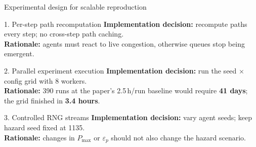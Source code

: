 \documentclass[aspectratio=169, xcolor=table]{beamer}
\begin{document}
\begin{frame}[t]{Experimental design for scalable reproduction}
\footnotesize

\begin{block}{\scriptsize 1. Per-step path recomputation}
\scriptsize
\textbf{Implementation decision:} recompute paths every step; no cross-step path caching.\\
\textbf{Rationale:} agents must react to live congestion, otherwise queues stop being emergent.
\end{block}

\vspace{0.3em}

\begin{block}{\scriptsize 2. Parallel experiment execution}
\scriptsize
\textbf{Implementation decision:} run the seed $\times$ config grid with 8 workers.\\
\textbf{Rationale:} 390 runs at the paper's 2.5\,h/run baseline would require \textbf{41 days}; the grid finished in \textbf{3.4 hours}.
\end{block}

\vspace{0.3em}

\begin{block}{\scriptsize 3. Controlled RNG streams}
\scriptsize
\textbf{Implementation decision:} vary agent seeds; keep hazard seed fixed at 1135.\\
\textbf{Rationale:} changes in $P_{\max}$ or $\varepsilon_p$ should not also change the hazard scenario.
\end{block}

\vspace{0.4em}
\begin{center}
\end{center}

\end{frame}
\end{document}
